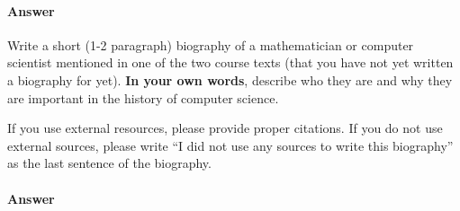\documentclass{article}
\begin{document}
\paragraph{Answer}



\collab{\todo{}}

Write a short (1-2 paragraph) biography of a mathematician or computer scientist
mentioned in one of the two course texts (that you have not yet written a
biography for yet).
\textbf{In your own words}, describe who they are and why they are important in
the history of computer science.

If you use external resources, please provide
proper citations. If you do not use external sources, please write ``I did not
use any sources to write this biography'' as the last sentence of the
biography.

\paragraph{Answer}


% 
% 
\end{document}
